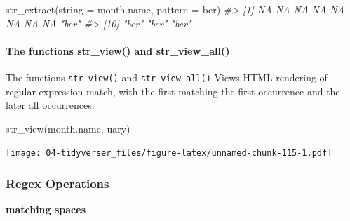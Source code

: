 \documentclass[
]{book}
\newenvironment{Shaded}{\begin{snugshade}}{\end{snugshade}}
\newcommand{\AttributeTok}[1]{\textcolor[rgb]{0.77,0.63,0.00}{#1}}
\newcommand{\CommentTok}[1]{\textcolor[rgb]{0.56,0.35,0.01}{\textit{#1}}}
\newcommand{\FunctionTok}[1]{\textcolor[rgb]{0.00,0.00,0.00}{#1}}
\newcommand{\NormalTok}[1]{#1}
\newcommand{\StringTok}[1]{\textcolor[rgb]{0.31,0.60,0.02}{#1}}
\begin{document}
\begin{Shaded}
\begin{Highlighting}[]
\FunctionTok{str\_extract}\NormalTok{(}\AttributeTok{string =}\NormalTok{ month.name, }\AttributeTok{pattern =} \StringTok{\textquotesingle{}ber\textquotesingle{}}\NormalTok{)}
\CommentTok{\#\textgreater{}  [1] NA    NA    NA    NA    NA    NA    NA    NA    "ber"}
\CommentTok{\#\textgreater{} [10] "ber" "ber" "ber"}
\end{Highlighting}
\end{Shaded}

\hypertarget{the-functions-str_view-and-str_view_all}{%
\paragraph{The functions str\_view() and str\_view\_all()}\label{the-functions-str_view-and-str_view_all}}

The functions \texttt{str\_view()} and \texttt{str\_view\_all()} Views HTML rendering of regular expression match, with the first matching the first occurrence and the later all occurrences.

\begin{Shaded}
\begin{Highlighting}[]
\FunctionTok{str\_view}\NormalTok{(month.name, }\StringTok{\textquotesingle{}uary\textquotesingle{}}\NormalTok{)}
\end{Highlighting}
\end{Shaded}

\texttt{[image: 04-tidyverser\_files/figure-latex/unnamed-chunk-115-1.pdf]}

\hypertarget{regex-operations-1}{%
\subsubsection{Regex Operations}\label{regex-operations-1}}

\textbf{matching spaces}
\end{document}

